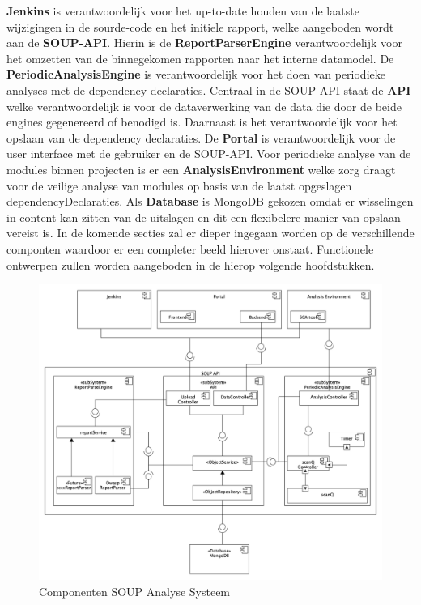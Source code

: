 \textbf{Jenkins} is verantwoordelijk voor het up-to-date houden van de laatste wijzigingen in de sourde-code en het initiele rapport, welke aangeboden wordt aan de \textbf{SOUP-API}. Hierin is de  \textbf{ReportParserEngine} verantwoordelijk voor het omzetten van de binnegekomen rapporten naar het interne datamodel. De \textbf{PeriodicAnalysisEngine} is verantwoordelijk voor het doen van periodieke analyses met de dependency declaraties. Centraal in de SOUP-API staat de \textbf{API} welke verantwoordelijk is voor de dataverwerking van de data die door de beide engines gegenereerd of benodigd is. Daarnaast is het verantwoordelijk voor het opslaan van de dependency declaraties. De \textbf{Portal} is verantwoordelijk voor de user interface met de gebruiker en de SOUP-API. Voor periodieke analyse van de modules binnen projecten is er een \textbf{AnalysisEnvironment} welke zorg draagt voor de veilige analyse van modules op basis van de laatst opgeslagen dependencyDeclaraties. Als \textbf{Database} is MongoDB gekozen omdat er wisselingen in content kan zitten van de uitslagen en dit een flexibelere manier van opslaan vereist is.
In de komende secties zal er dieper ingegaan worden op de verschillende componten waardoor er een completer beeld hierover onstaat. Functionele ontwerpen zullen worden aangeboden in de hierop volgende hoofdstukken.

\begin{figure}[bth]
    \myfloatalign
    \includegraphics[width=17cm]{gfx/umlet/exports/ApplicationComponents}
    \caption{Componenten SOUP Analyse Systeem}
    \label{fig:SOUP-Components}
\end{figure}
\clearpage
